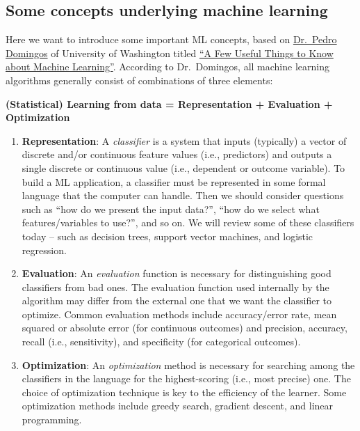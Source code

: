 \documentclass[
]{book}
\begin{document}
\hypertarget{some-concepts-underlying-machine-learning}{%
\subsection{Some concepts underlying machine learning}\label{some-concepts-underlying-machine-learning}}

Here we want to introduce some important ML concepts, based on \href{https://homes.cs.washington.edu/~pedrod/}{Dr.~Pedro Domingos} of University of Washington titled \href{https://homes.cs.washington.edu/~pedrod/papers/cacm12.pdf}{``A Few Useful Things to Know about Machine Learning''}. According to Dr.~Domingos, all machine learning algorithms generally consist of combinations of three elements:

\textbf{(Statistical) Learning from data = Representation + Evaluation + Optimization}

\begin{enumerate}
\def\labelenumi{\arabic{enumi}.}
\item
  \textbf{Representation}: A \emph{classifier} is a system that inputs (typically) a vector of discrete and/or continuous feature values (i.e., predictors) and outputs a single discrete or continuous value (i.e., dependent or outcome variable). To build a ML application, a classifier must be represented in some formal language that the computer can handle. Then we should consider questions such as ``how do we present the input data?'', ``how do we select what features/variables to use?'', and so on. We will review some of these classifiers today -- such as decision trees, support vector machines, and logistic regression.
\item
  \textbf{Evaluation}: An \emph{evaluation} function is necessary for distinguishing good classifiers from bad ones. The evaluation function used internally by the algorithm may differ from the external one that we want the classifier to optimize. Common evaluation methods include accuracy/error rate, mean squared or absolute error (for continuous outcomes) and precision, accuracy, recall (i.e., sensitivity), and specificity (for categorical outcomes).
\item
  \textbf{Optimization}: An \emph{optimization} method is necessary for searching among the classifiers in the language for the highest-scoring (i.e., most precise) one. The choice of optimization technique is key to the efficiency of the learner. Some optimization methods include greedy search, gradient descent, and linear programming.
\end{enumerate}
\end{document}

